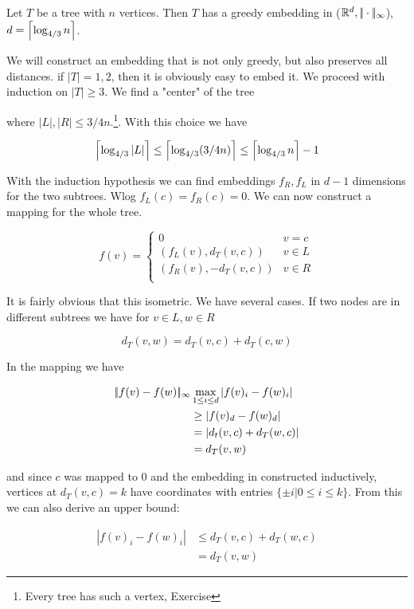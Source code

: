 \begin{thm} Let $T$ be a tree with $n$ vertices. Then $T$ has a greedy embedding in ($\mathbb{R}^d,|\!|\cdot|\!|_{\infty}$), $d=\left\lceil \log_{4/3}n \right\rceil$.
\end{thm}

\begin{pr} We will construct an embedding that is not only greedy, but also preserves all distances. if $|T|=1,2$, then it is obviously easy to embed it. We proceed with induction on $|T|\geq 3$. We find a "center" of the tree


where $|L|,|R| \leq 3/4n$.\footnote{Every tree has such a vertex, Exercise}. With this choice we have

\[\left\lceil \log_{4/3}|L| \right\rceil \leq \left\lceil \log_{4/3}(3/4n) \right\rceil \leq \left\lceil \log_{4/3}n \right\rceil-1\]

With the induction hypothesis we can find embeddings $f_R,f_L$ in $d-1$ dimensions for the two subtrees. Wlog $f_L(c) = f_R(c) = 0$. We can now construct a mapping for the whole tree.

\[f(v) = \begin{cases}
0& v=c\\
(f_L(v),d_T(v,c)) & v\in L\\
(f_R(v),-d_T(v,c)) & v\in R\\
\end{cases}\]

It is fairly obvious that this isometric. We have several cases. If two nodes are in different subtrees we have for $v\in L, w\in R$

\[d_T(v,w)=d_T(v,c)+d_T(c,w)\]

In the mapping we have

\begin{align*}
|\!|f(v)-f(w)|\!|_{\infty} & \max_{1\leq i\leq d} |f(v)_i-f(w)_i|\\
	&\geq |f(v)_d-f(w)_d|\\
	&= |d_t(v,c)+d_T(w,c)|\\
	&=d_T(v,w)
\end{align*}

and since $c$ was mapped to $0$ and the embedding in constructed inductively, vertices at $d_T(v,c)=k$ have coordinates with entries $\{\pm i |0\leq i\leq k\}$. From this we can also derive an upper bound:

\begin{align*}
|f(v)_i-f(w)_i| &\leq d_T(v,c)+d_T(w,c)\\
	&=d_T(v,w)
\end{align*}	


\end{pr}
